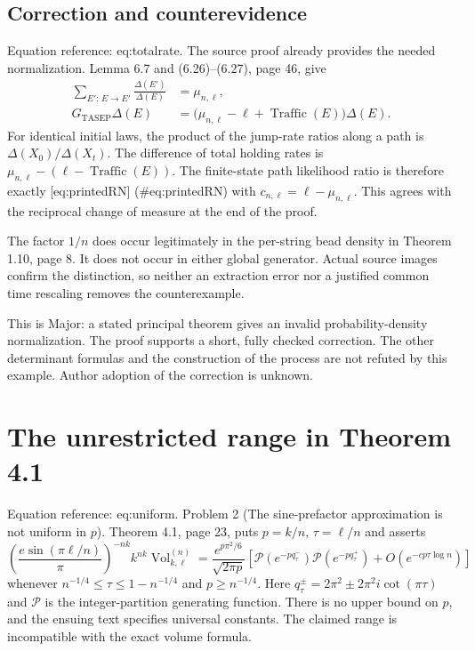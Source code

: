 \documentclass[10pt]{article}
\begin{document}
\subsection*{Correction and counterevidence}
Equation reference: eq:totalrate. The source proof already provides the needed normalization. Lemma 6.7 and (6.26)–(6.27), page 46, give \[\begin{aligned}
 \sum_{E':\,E\to E'}\frac{\Delta(E')}{\Delta(E)}
 &=\mu_{n,\ell},\\
 G_{\mathrm{TASEP}}\Delta(E)
 &=\bigl(\mu_{n,\ell}-\ell+\operatorname{Traffic}(E)\bigr)\Delta(E).\end{aligned}\] For identical initial laws, the product of the jump-rate ratios along a path is \(\Delta(X_0)/\Delta(X_t)\). The difference of total holding rates is \(\mu_{n,\ell}-(\ell-\operatorname{Traffic}(E))\). The finite-state path likelihood ratio is therefore exactly [eq:printedRN] (\#eq:printedRN) with \(c_{n,\ell}=\ell-\mu_{n,\ell}\). This agrees with the reciprocal change of measure at the end of the proof.\par
The factor \(1/n\) does occur legitimately in the per-string bead density in Theorem 1.10, page 8. It does not occur in either global generator. Actual source images confirm the distinction, so neither an extraction error nor a justified common time rescaling removes the counterexample.\par
This is Major: a stated principal theorem gives an invalid probability-density normalization. The proof supports a short, fully checked correction. The other determinant formulas and the construction of the process are not refuted by this example. Author adoption of the correction is unknown.\par
\section*{The unrestricted range in Theorem 4.1}
Equation reference: eq:uniform. Problem 2 (The sine-prefactor approximation is not uniform in \(p\)).  Theorem 4.1, page 23, puts \(p=k/n\), \(\tau=\ell/n\) and asserts \[
 \left(\frac{e\sin(\pi\ell/n)}{\pi}\right)^{-nk}
 k^{nk}\operatorname{Vol}^{(n)}_{k,\ell}
 =
 \frac{e^{p\pi^2/6}}{\sqrt{2\pi p}}
 \left[
 \mathcal P(e^{-pq_\tau^-})\mathcal P(e^{-pq_\tau^+})
 +O(e^{-cp\tau\log n})
 \right]\] whenever \(n^{-1/4}\leq\tau\leq1-n^{-1/4}\) and \(p\geq n^{-1/4}\). Here \(q_\tau^\pm=2\pi^2\pm2\pi^2i\cot(\pi\tau)\) and \(\mathcal P\) is the integer-partition generating function. There is no upper bound on \(p\), and the ensuing text specifies universal constants. The claimed range is incompatible with the exact volume formula.\par
\end{document}
